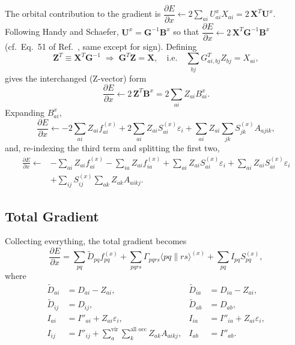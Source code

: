 \documentclass[12pt]{article}
\newcommand{\adb}[2]{\langle #1 \| #2 \rangle}
\newcommand{\vir}{\text{vir}}
\newcommand{\alloc}{\text{all occ}}   %
\begin{document}
\noindent
The orbital contribution to the gradient is
$\dfrac{\partial E}{\partial x} \leftarrow 2\sum_{ai} U^x_{ai} X_{ai}
= 2\,\mathbf{X}^{T}\mathbf{U}^{x}$.
Following Handy and Schaefer,\cite{Handy84}
$\mathbf{U}^{x} = \mathbf{G}^{-1}\mathbf{B}^{x}$ so that
$\dfrac{\partial E}{\partial x} \leftarrow 2\,\mathbf{X}^{T}\mathbf{G}^{-1}\mathbf{B}^{x}$
(cf.\ Eq.~51 of Ref.~, same except for sign).  Defining
\begin{equation}
\mathbf{Z}^{T} \equiv \mathbf{X}^{T}\mathbf{G}^{-1}
\;\Longrightarrow\;
\mathbf{G}^{T}\mathbf{Z} = \mathbf{X}, \quad\text{i.e.}\quad
\sum_{bj} G_{ai,bj}^{T} Z_{bj} = X_{ai},
\end{equation}
gives the interchanged (Z-vector) form
\begin{equation}
\frac{\partial E}{\partial x} \leftarrow 2\,\mathbf{Z}^{T}\mathbf{B}^{x}
= 2\sum_{ai} Z_{ai} B^x_{ai}.
\end{equation}
Expanding $B^x_{ai}$,
\begin{equation}
\frac{\partial E}{\partial x} \leftarrow
-2\sum_{ai} Z_{ai} f^{(x)}_{ai}
+ 2\sum_{ai} Z_{ai} S^{(x)}_{ai}\varepsilon_i
+ \sum_{ai} Z_{ai}\sum_{jk} S^{(x)}_{jk}A_{ajik},
\end{equation}
and, re-indexing the third term and splitting the first two,
\begin{align}
\frac{\partial E}{\partial x} \leftarrow
&-\sum_{ai} Z_{ai} f^{(x)}_{ai} - \sum_{ia} Z_{ai} f^{(x)}_{ia}
+ \sum_{ai} Z_{ai} S^{(x)}_{ai}\varepsilon_i + \sum_{ai} Z_{ai} S^{(x)}_{ai}\varepsilon_i
\nonumber\\
&+ \sum_{ij} S^{(x)}_{ij}\sum_{ak} Z_{ak}A_{aikj}.
\end{align}

\subsection{Total Gradient}
\label{sec:total-grad}

Collecting everything, the total gradient becomes
\begin{equation}
\frac{\partial E}{\partial x}
= \sum_{pq} \tilde{D}_{pq} f^{(x)}_{pq}
+ \sum_{pqrs}\Gamma_{pqrs}\adb{pq}{rs}^{(x)}
+ \sum_{pq} I_{pq} S^{(x)}_{pq},
\label{eq:grad-final}
\end{equation}
where
\begin{align}
\tilde{D}_{ai} &= D_{ai} - Z_{ai}, & \tilde{D}_{ia} &= D_{ia} - Z_{ai}, \\
\tilde{D}_{ij} &= D_{ij}, & \tilde{D}_{ab} &= D_{ab}, \\
I_{ai} &= I''_{ai} + Z_{ai}\varepsilon_i, & I_{ia} &= I''_{ia} + Z_{ai}\varepsilon_i, \\
I_{ij} &= I''_{ij} + \sum_{a}^{\vir}\sum_{k}^{\alloc} Z_{ak}A_{aikj}, & I_{ab} &= I''_{ab}.
\end{align}
\end{document}

